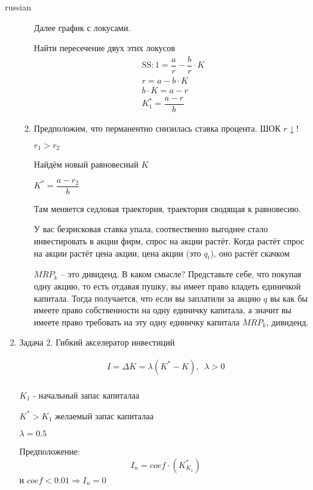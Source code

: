 \documentclass{article}
\begin{document}
\begin{otherlanguage*}{russian}
\begin{enumerate}
\begin{enumerate}
Далее график с локусами. 

Найти пересечение двух этих локусов
\begin{align*}
\text{SS}: 1 = \dfrac{a}{r} - \dfrac{b}{r} \cdot K \\
r = a - b \cdot K \\ 
b \cdot K = a - r \\ 
K^*_1 = \dfrac{a - r}{b}
\end{align*}

\item Предположим, что перманентно снизилась ставка процента. ШОК $r \downarrow$!

$r_1 > r_2 $ 

Найдём новый равновесный $ K $ 

$ K^* = \dfrac{a - r_2}{b} $

Там меняется седловая траектория, траектория сводящая к равновесию. 

У вас безрисковая ставка упала, соотвественно выгоднее стало инвестировать в акции фирм, спрос на акции растёт. Когда растёт спрос на акции растёт цена акции, цена акции (это $ q_t$), оно растёт скачком 

$ MRP_k$ -- это дивиденд. В каком смысле? Представьте себе, что покупая одну акцию, то есть отдавая пушку, вы имеет право владеть единичкой капитала. Тогда получается, что если вы заплатили за акцию $ q$ вы как бы имеете право собственности на одну единичку капитала, а значит вы имеете право требовать на эту одну единичку капитала $ MRP_k $, дивиденд.
\end{enumerate}
\item Задача 2. Гибкий акселератор инвестиций

\begin{align*}
I = \Delta K = \lambda (K^* - K), \, \, \, \lambda > 0 \\ 
\end{align*}

$ K_1 $ - начальный запас капиталаа

$ K^* > K_1 $ желаемый запас капиталаа

$ \lambda = 0.5 $ 

Предположение:  $$ I_n = coef \cdot (K^*_{K_1}) $$ и $ coef < 0.01 \Rightarrow I_n = 0 $  


\end{enumerate}
\end{otherlanguage*}
\end{document}
